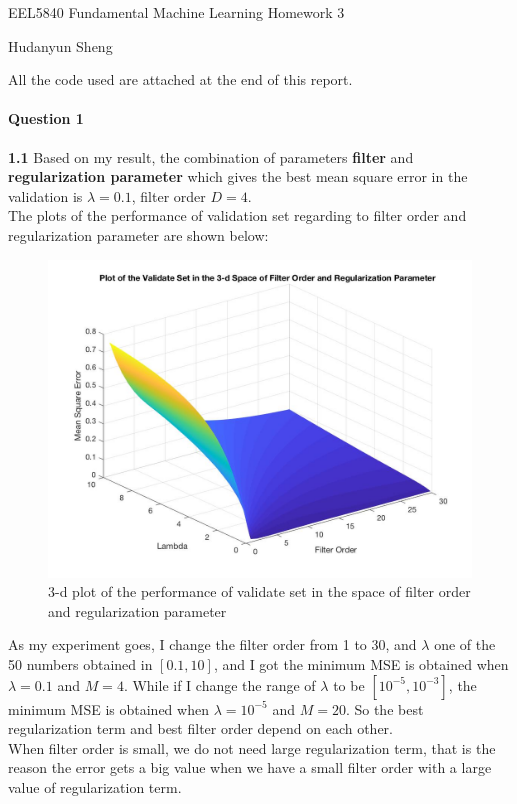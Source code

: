 \documentclass[a4paper]{article}
\begin{document}
\begin{spacing}{2.0}
\begin{flushleft}\begin{huge}EEL5840 Fundamental Machine Learning   Homework 3\end{huge}\end{flushleft}
\begin{flushright}\begin{Large} Hudanyun Sheng \end{Large}\end{flushright}

\Large{All the code used are attached at the end of this report.}

\paragraph{\huge\textbf{ Question 1\\} }
\normalsize
\textbf{1.1}  
	 Based on my result, the combination of parameters \textbf{filter} and \textbf{regularization parameter} which gives the best mean square error in the 	validation is $\lambda = 0.1$, filter order $D = 4$.\\
	 The plots of the performance of validation set regarding to filter order and regularization parameter are shown below: 
	 \begin{figure}[H]
	    \centering
	        \includegraphics[width=6in]{1_1_2.jpg}
	        \caption{3-d plot of the performance of validate set in the space of filter order and regularization parameter}
	        \label{fig:side:a}
	  \end{figure}
	As my experiment goes, I change the filter order from 1 to 30, and $\lambda$ one of the 50 numbers obtained in $[0.1, 10]$, and I got the minimum MSE is obtained when $\lambda = 0.1$ and $M = 4$. While if I change the range of $\lambda$ to be $[10^{-5}, 10^{-3}]$, the minimum MSE is obtained when $\lambda = 10^{-5}$ and $M = 20$. So the best regularization term and best filter order depend on each other.\\
	When filter order is small, we do not need large regularization term, that is the reason the error gets a big value when we have a small filter order with 	a large value of regularization term.\\
	

\end{spacing}
\end{document}
